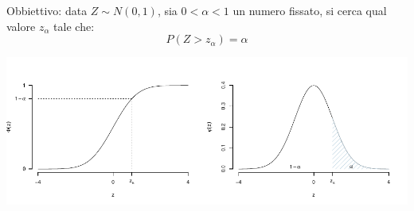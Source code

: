 \documentclass[
  11pt,
]{book}
\theoremstyle{mytheoremstyle}
\theoremstyle{mydefstyle}
\begin{document}
Obbiettivo: data \(Z\sim N(0,1)\), sia \(0<\alpha<1\) un numero fissato, si cerca qual valore \(z_\alpha\) tale che:
\[P(Z > z_\alpha)=\alpha\]

\begin{center}\includegraphics{Appunti_di_Statistica_2025_files/figure-latex/07c-Normale-27-1} \end{center}
\end{document}
